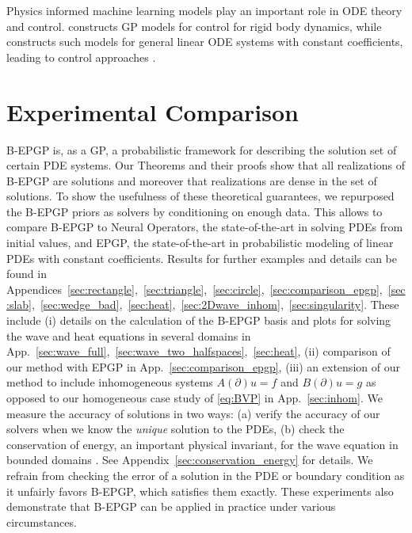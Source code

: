 \documentclass{article} %
\theoremstyle{plain}
\theoremstyle{definition}
\theoremstyle{remark}
\begin{document}
Physics informed machine learning models play an important role in ODE theory and control.
\citep{pmlr-v120-geist20a} constructs GP models for control for rigid body dynamics, while \citep{besginow2022constraining} constructs such models for general linear ODE systems with constant coefficients, leading to control approaches \citep{besginow2025linear,tebbe2024physics}.

\section{Experimental Comparison}\label{sec:comparison}

B-EPGP is, as a GP, a probabilistic framework for describing the solution set of certain PDE systems.
Our Theorems and their proofs  show that all realizations of B-EPGP are solutions and moreover that realizations are dense in the set of solutions.
To show the usefulness of these theoretical guarantees, we repurposed the B-EPGP priors as solvers by conditioning on enough data.
This allows to compare B-EPGP to Neural Operators, the state-of-the-art in solving PDEs from initial values, and EPGP, the state-of-the-art in probabilistic modeling of linear PDEs with constant coefficients.
Results for further examples and details can be found in  Appendices~\ref{sec:rectangle},~\ref{sec:triangle},~\ref{sec:circle},~\ref{sec:comparison_epgp},~\ref{sec:slab},~\ref{sec:wedge_bad},~\ref{sec:heat},~\ref{sec:2Dwave_inhom},~\ref{sec:singularity}.
These include (i) details on the calculation of the B-EPGP basis and plots for solving the wave and heat equations in several domains in App.~\ref{sec:wave_full},~\ref{sec:wave_two_halfspaces},~\ref{sec:heat}, (ii) comparison of our method with EPGP  in App.~\ref{sec:comparison_epgp}, (iii) an extension of our method to include inhomogeneous systems $A(\partial) u=f$ and $B(\partial) u=g$ as opposed to our homogeneous case study of \eqref{eq:BVP}  in App.~\ref{sec:inhom}.
We measure the accuracy of solutions in two ways:
(a) verify the accuracy of our solvers when we know the \emph{unique} solution to the PDEs,
(b) check the conservation of energy, an important physical invariant, for the wave equation in bounded domains \citep{hansen2023learning}. See Appendix~\ref{sec:conservation_energy} for details.
We refrain from checking the error of a solution in the PDE or boundary condition as it unfairly favors B-EPGP, which satisfies them exactly.
These experiments also demonstrate that B-EPGP can be applied in practice under various circumstances.
\end{document}
